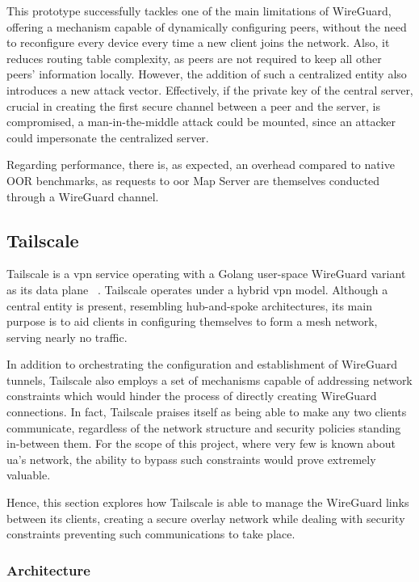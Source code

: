 \documentclass[11pt,twoside,a4paper]{report}
\begin{document}
This prototype successfully tackles one of the main limitations of WireGuard, offering a mechanism capable of dynamically configuring peers, without the need to reconfigure every device every time a new client joins the network. Also, it reduces routing table complexity, as peers are not required to keep all other peers' information locally. However, the addition of such a centralized entity also introduces a new attack vector. Effectively, if the private key of the central server, crucial in creating the first secure channel between a peer and the server, is compromised, a man-in-the-middle attack could be mounted, since an attacker could impersonate the centralized server.

Regarding performance, there is, as expected, an overhead compared to native OOR benchmarks, as requests to \ac{oor} Map Server are themselves conducted through a WireGuard channel.
\fi

\subsection{Tailscale}

Tailscale is a \ac{vpn} service operating with a Golang user-space WireGuard variant as its data plane ~\cite{tailscale2020online}. Tailscale operates under a hybrid \ac{vpn} model. Although a central entity is present, resembling hub-and-spoke architectures, its main purpose is to aid clients in configuring themselves to form a mesh network, serving nearly no traffic.

In addition to orchestrating the configuration and establishment of WireGuard tunnels, Tailscale also employs a set of mechanisms capable of addressing network constraints which would hinder the process of directly creating WireGuard connections. In fact, Tailscale praises itself as being able to make any two clients communicate, regardless of the network structure and security policies standing in-between them. For the scope of this project, where very few is known about \ac{ua}'s network, the ability to bypass such constraints would prove extremely valuable.

Hence, this section explores how Tailscale is able to manage the WireGuard links between its clients, creating a secure overlay network while dealing with security constraints preventing such communications to take place.

\subsubsection{Architecture}
\end{document}
